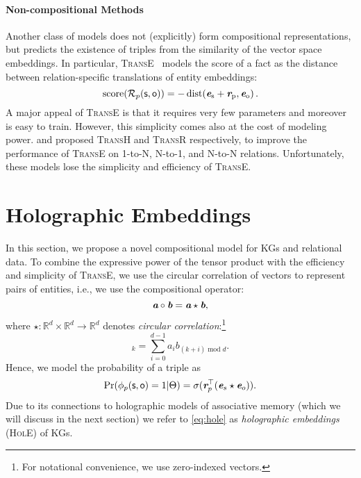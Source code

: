 \documentclass[letterpaper]{article}
\renewcommand{\vec}[1]{\textit{\textbf{#1}}}
\newcommand{\ve}{\vec{e}}
\newcommand{\vr}{\vec{r}}
\newcommand{\va}{\vec{a}}
\newcommand{\vb}{\vec{b}}
\newcommand{\comp}{\circ}
\newcommand{\ccorr}{\star}
\newcommand{\hole}{\textsc{HolE}\xspace}
\newcommand{\transe}{\textsc{TransE}\xspace}
\newcommand{\transr}{\textsc{TransR}\xspace}
\newcommand{\transh}{\textsc{TransH}\xspace}
\newcommand{\Set}[1]{\mathcal{#1}}
\newcommand{\transp}{\top}
\newcommand{\R}{\mathbb{R}}
\newcommand{\SR}{\Set{R}}
\newcommand{\Ss}{\textsf{s}}
\newcommand{\So}{\textsf{o}}
\begin{document}
\paragraph{Non-compositional Methods}
Another class of models does not (explicitly) form compositional
representations, but predicts the existence of triples from
the similarity of the vector space embeddings. In particular,
\transe~\citep{bordes2013translating} models the score of a fact as
the distance between relation-specific translations of entity embeddings:
\begin{equation}
  \operatorname{score}(\SR_p(\Ss, \So)) = -\operatorname{dist(\ve_s + \vr_p, \ve_o)} .
\end{equation}
A major appeal of \transe is that it requires very few parameters and moreover is
easy to train. However, this simplicity comes also at the cost of modeling
power. \citet{wang2014knowledge} and \citet{lin2015learning}
proposed \transh and \transr respectively, to improve the performance of \transe
on 1-to-N, N-to-1, and N-to-N relations.
Unfortunately, these models lose the
simplicity and efficiency of \transe.




\section{Holographic Embeddings}

\label{sec:hole}
In this section, we propose a novel compositional model for KGs and relational data. 
To combine the expressive power of the tensor product with the
efficiency and simplicity of \transe, we use the circular correlation 
of vectors to represent pairs of entities, i.e., we use the compositional operator:
\begin{equation}
  \label{eq:hole-comp}
  \va \comp \vb = \va \ccorr \vb ,
\end{equation}
where $\ccorr : \R^d \times \R^d \to \R^d$ denotes
\emph{circular correlation}:\footnote{For notational convenience, we use
  zero-indexed vectors.}
\begin{equation}
  [\vec{a} \ccorr \vec{b}]_k = \sum_{i=0}^{d-1} a_i b_{(k + i) \operatorname{mod} d} .
  \label{eq:ccorr}
\end{equation}
Hence, we model the probability of a triple as
\begin{equation}
  \label{eq:hole}
  \Pr(\phi_p(\Ss, \So) = 1 | \Theta) = \sigma(\vr_p^\transp (\ve_s \ccorr \ve_o)) .
\end{equation}
Due to its connections to holographic models of associative memory (which we
will discuss in the next section) we refer to \cref{eq:hole} as
\emph{holographic embeddings} (\hole) of KGs.
\end{document}
